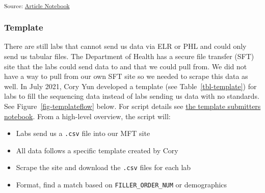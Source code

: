 \documentclass[
]{agujournal2019}
\providecommand{\tightlist}{%
  \setlength{\itemsep}{0pt}\setlength{\parskip}{0pt}}\usepackage{longtable,booktabs,array}
\begin{document}
\textsubscript{Source:
\href{https://NW-PaGe.github.io/sequencing_integration_pipeline1.0/index.qmd.html}{Article
Notebook}}

\subsubsection{Template}\label{sec-template}

There are still labs that cannot send us data via ELR or PHL and could
only send us tabular files. The Department of Health has a secure file
transfer (SFT) site that the labs could send data to and that we could
pull from. We did not have a way to pull from our own SFT site so we
needed to scrape this data as well. In July 2021, Cory Yun developed a
template (see Table~\ref{tbl-template}) for labs to fill the sequencing
data instead of labs sending us data with no standards. See
Figure~\ref{fig-templateflow} below. For script details see
\href{notebooks/template_submitters.Rmd}{the template submitters
notebook}. From a high-level overview, the script will:

\begin{itemize}
\tightlist
\item
  Labs send us a \texttt{.csv} file into our MFT site\hspace{0pt}
\item
  All data follows a specific template created by Cory\hspace{0pt}
\item
  Scrape the site and download the \texttt{.csv} files for each
  lab\hspace{0pt}
\item
  Format, find a match based on \texttt{FILLER\_ORDER\_NUM} or
  demographics
\end{itemize}
\end{document}
